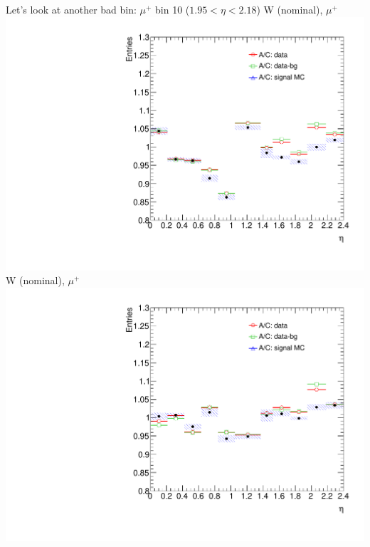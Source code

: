  {
Let's look at another bad bin: $\mu^{+}$ bin 10 ($1.95<\eta<2.18$)
}
 {
\colb[T]
\centering
\small{ W (nominal), $\mu^{+}$}
\includegraphics[width=1.0\textwidth]{dates/20130306/figures/both/W_NOM_Q0_stack_d3_eta_lpt_met_y_2__1_z_0__1_POS}
\centering
\small{ W (nominal), $\mu^{+}$}
\includegraphics[width=1.0\textwidth]{dates/20130306/figures/both/W_NOM_Q0_stack_d3_eta_lpt_met_y_2__1_z_0__1_NEG}
\cole
}
